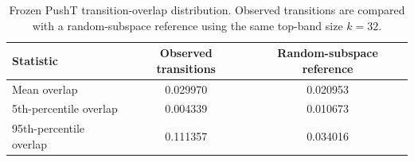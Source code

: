 \documentclass{article}
\begin{document}
\begin{table}[H]
\centering
\small
\setlength{\tabcolsep}{3pt}
\caption{Frozen PushT top-band readouts. Observed top-$32$ lift is compared with a norm-matched randomized control; ratios above one indicate greater concentration in the top covariance band than in the reference.}
\label{tab:supp-pusht-lift}
\end{table}

\begin{table}[H]
\centering
\small
\setlength{\tabcolsep}{3pt}
\caption{Frozen PushT label-shuffle controls. Shuffles remove action labels, state-cluster labels, or temporal ordering while retaining the same frozen latent records and top-$32$ readout.}
\label{tab:supp-pusht-shuffle}
\end{table}

\begin{table}[H]
\centering
\caption{Frozen PushT transition-overlap distribution. Observed transitions are compared with a random-subspace reference using the same top-band size $k=32$.}
\label{tab:supp-pusht-overlap}
\begin{tabular}{lcc}
\toprule
Statistic & Observed transitions & Random-subspace reference \\
\midrule
Mean overlap & 0.029970 & 0.020953 \\
5th-percentile overlap & 0.004339 & 0.010673 \\
95th-percentile overlap & 0.111357 & 0.034016 \\
\bottomrule
\end{tabular}
\end{table}
\end{document}
